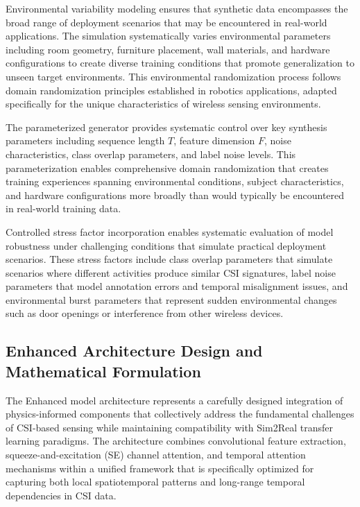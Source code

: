 \documentclass[journal]{IEEEtran}
\begin{document}
Environmental variability modeling ensures that synthetic data encompasses the broad range of deployment scenarios that may be encountered in real-world applications. The simulation systematically varies environmental parameters including room geometry, furniture placement, wall materials, and hardware configurations to create diverse training conditions that promote generalization to unseen target environments. This environmental randomization process follows domain randomization principles established in robotics applications, adapted specifically for the unique characteristics of wireless sensing environments.

The parameterized generator provides systematic control over key synthesis parameters including sequence length $T$, feature dimension $F$, noise characteristics, class overlap parameters, and label noise levels. This parameterization enables comprehensive domain randomization that creates training experiences spanning environmental conditions, subject characteristics, and hardware configurations more broadly than would typically be encountered in real-world training data.

Controlled stress factor incorporation enables systematic evaluation of model robustness under challenging conditions that simulate practical deployment scenarios. These stress factors include class overlap parameters that simulate scenarios where different activities produce similar CSI signatures, label noise parameters that model annotation errors and temporal misalignment issues, and environmental burst parameters that represent sudden environmental changes such as door openings or interference from other wireless devices.

\subsection{Enhanced Architecture Design and Mathematical Formulation}

The Enhanced model architecture represents a carefully designed integration of physics-informed components that collectively address the fundamental challenges of CSI-based sensing while maintaining compatibility with Sim2Real transfer learning paradigms. The architecture combines convolutional feature extraction, squeeze-and-excitation (SE) channel attention, and temporal attention mechanisms within a unified framework that is specifically optimized for capturing both local spatiotemporal patterns and long-range temporal dependencies in CSI data.
\end{document}
